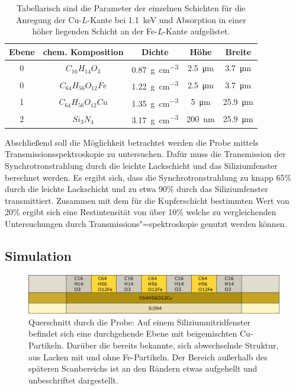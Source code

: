  \begin{table}[H]
 \centering
 \begin{tabular}{|c|c|c|c|c|} \hline
  Ebene & chem. Komposition & Dichte & Höhe & Breite	\\ \hline
  0 & $C_{16}H_{14}O_{3}$ 		& \SI{0.87}{\gram\per\cubic\centi\meter}	& \SI{2.5}{\micro\meter} & \SI{3.7}{\micro\meter} \\ \hline
  0 & $C_{64}H_{56}O_{12}Fe$	& \SI{1.22}{\gram\per\cubic\centi\meter}	& \SI{2.5}{\micro\meter} & \SI{3.7}{\micro\meter} \\ \hline
  1 & $C_{64}H_{56}O_{12}Cu$	& \SI{1.35}{\gram\per\cubic\centi\meter}	& \SI{5}{\micro\meter} & \SI{25.9}{\micro\meter} \\ \hline
  2 & $Si_{3}N_{4}$				& \SI{3.17}{\gram\per\cubic\centi\meter}	& \SI{200}{\nano\meter} & \SI{25.9}{\micro\meter} \\ \hline
 \end{tabular}
   \caption{Tabellarisch sind die Parameter der einzelnen Schichten für die Anregung der Cu-$L$-Kante bei \SI{1.1}{\kilo\electronvolt} und Absorption in einer höher liegenden Schicht an der Fe-$L$-Kante aufgelistet.}
 \label{tab:cu_fe}
 \end{table}
 
Abschließend soll die Möglichkeit betrachtet werden die Probe mittels Transmissions\-spektroskopie zu untersuchen. Dafür muss die Transmission der Synchrotronstrahlung durch die leichte Lackschicht und das Siliziumfenster berechnet werden. Es ergibt sich, dass die Synchrotronstrahlung zu knapp 65\% durch die leichte Lackschicht und zu etwa 90\% durch das Siliziumfenster transmittiert. Zusammen mit dem für die Kupferschicht bestimmten Wert von 20\% ergibt sich eine Restintensität von über 10\% welche zu vergleichenden Untersuchungen durch Transmissions"=spektroskopie genutzt werden können.

\subsection{Simulation}
\begin{figure}[H] 
  \centering
     \includegraphics[width=1\textwidth]{illustrations/cu_unter_fe.png}
  \caption[Probendesign Kupferkante]{Querschnitt durch die Probe: Auf einem Siliziumnitridfenster befindet sich eine durchgehende Ebene mit beigemischten Cu-Partikeln. Darüber die bereits bekannte, sich abwechselnde Struktur, aus Lacken mit und ohne Fe-Partikeln. Der Bereich außerhalb des späteren Scanbereichs ist an den Rändern etwas aufgehellt und unbeschriftet dargestellt.}
  \label{fig:cu_unter_fe}
\end{figure}

